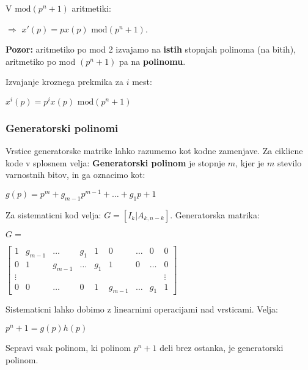 \documentclass{article}
\begin{document}
\begin{multicols}{3}
V $\text{mod}(p^n + 1)$ aritmetiki:
\begin{center}
    $\Rightarrow$ $x'(p) = px(p) \text{ mod}(p^n + 1)$.
\end{center}

\textbf{Pozor:} aritmetiko po mod 2 izvajamo na \textbf{istih} stopnjah polinoma (na bitih), aritmetiko
po mod $(p^n + 1)$ pa na \textbf{polinomu}.

Izvajanje kroznega prekmika za $i$ mest:
\begin{center}
    \begin{math}
        x^i(p) = p^i x(p) \text{ mod} (p^n + 1)
    \end{math}
\end{center}

\subsubsection{Generatorski polinomi}
Vrstice generatorske matrike lahko razumemo kot kodne zamenjave.
Za ciklicne kode v splosnem velja: \textbf{Generatorski polinom} je stopnje $m$, kjer je $m$ stevilo
varnostnih bitov, in ga oznacimo kot:
\begin{center}
    \begin{math}
        g(p) = p^m + g_{m-1}p^{m-1} + \dots + g_1p + 1
    \end{math}
\end{center}
Za sistematicni kod velja: $G = [I_k | A_{k, n-k}]$.
Generatorska matrika:
\begin{center}
    $G= $
    \begin{tiny}
        \begin{math}
            \begin{bmatrix}
                1 & g_{m - 1} &  \dots & g_1 & 1 & 0 & \dots & 0 & 0 \\
                0 & 1         & g_{m-1} & \dots & g_1 & 1 & 0 & \dots & 0 \\
                \vdots & & & & & & & & \vdots  \\
                0 & 0 & \dots & 0 & 1 & g_{m-1} & \dots & g_1 & 1
            \end{bmatrix}
        \end{math}
    \end{tiny}
\end{center}
Sistematicni lahko dobimo z linearnimi operacijami nad vrsticami.
Velja:
\begin{center}
    \begin{math}
        p^n + 1 = g(p)h(p)
    \end{math}
\end{center}
Sepravi vsak polinom, ki polinom $p^n + 1$ deli brez ostanka, je generatorski polinom.


\end{multicols}
\end{document}
